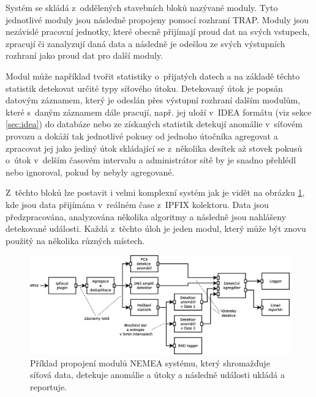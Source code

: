 Systém se skládá z~oddělených stavebních bloků nazývané moduly. Tyto jednotlivé moduly jsou následně propojeny pomocí rozhraní TRAP. Moduly jsou nezávislé pracovní jednotky, které obecně přijímají proud dat na svých vstupech, zpracují či zanalyzují daná data a následně je odešlou ze svých výstupních rozhraní jako proud dat pro další moduly. 

Modul může například tvořit statistiky o~přijatých datech a na základě těchto statistik detekovat určité typy síťového útoku. Detekovaný útok je popsán datovým záznamem, který je odeslán přes výstupní rozhraní dalším modulům, které s~daným záznamem dále pracují, např. jej uloží v~IDEA formátu (viz sekce \ref{sec:idea}) do databáze nebo ze získaných statistik detekují anomálie v~síťovém provozu a dokáží tak jednotlivé pokusy od jednoho útočníka agregovat a zpracovat jej jako jediný útok skládající se z~několika desítek až stovek pokusů o~útok v~delším časovém intervalu a administrátor sítě by je snadno přehlédl nebo ignoroval, pokud by nebyly agregované.

Z~těchto bloků lze postavit i velmi komplexní systém jak je vidět na obrázku \ref{fig:nemea-example-2}, kde jsou data přijímána v~reálném čase z~IPFIX\cite{ipfix} kolektoru. Data jsou předzpracována, analyzována několika algoritmy a následně jsou nahlášeny detekované události. Každá z~těchto úloh je jeden modul, který může být znovu použitý na několika různých místech.

\begin{figure}[h]
    \centering
    \includegraphics[width=1\textwidth]{fig/nemea-example-2-cz.eps}
    \caption{Příklad propojení modulů NEMEA systému, který shromažďuje síťová data, detekuje anomálie a útoky a následně události ukládá a reportuje.} \label{fig:nemea-example-2}
  
\end{figure}



